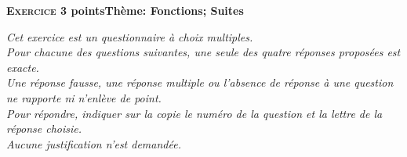 \documentclass[11pt,a4paper,french]{article}
\begin{document}
\bigskip

\textbf{\textsc{Exercice 3}  points\hfill Thème: Fonctions; Suites}

\medskip

\emph{Cet exercice est un questionnaire à choix multiples.\\
Pour chacune des questions suivantes, une seule des quatre réponses proposées est exacte.\\
Une réponse fausse, une réponse multiple ou l'absence de réponse à une question ne rapporte ni n'enlève de point.\\
Pour répondre, indiquer sur la copie le numéro de la question et la lettre de la réponse choisie.\\Aucune justification n'est demandée.}

\medskip
\end{document}

